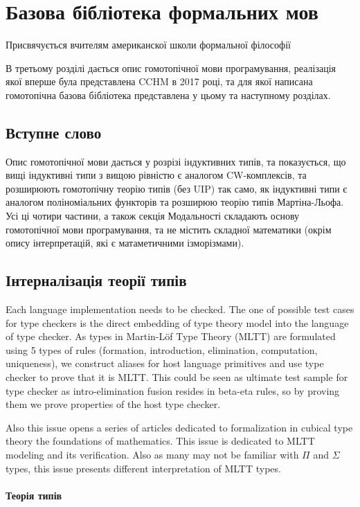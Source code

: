 \chapter{Базова бібліотека формальних мов}
\epigraph{Присвячується вчителям американскої школи формальної філософії}{}

В третьому розділі дається опис гомотопічної мови програмування,
реалізація якої вперше була представлена CCHM в 2017 році, та для якої написана
гомотопічна базова бібліотека представлена у цьому та наступному розділах.

\section*{Вступне слово}

Опис гомотопічної мови дається у розрізі індуктивних типів, та показується,
що вищі індуктивні типи з вищою рівністю є аналогом CW-комплексів, та розширюють
гомотопічну теорію типів (без UIP) так само, як індуктивні типи є аналогом
поліноміальних функторів та розширюю теорію типів Мартіна-Льофа. Усі ці чотири
частини, а також секція Модальності складають основу гомотопічної мови програмування,
та не містить складної математики (окрім опису інтерпретацій,
які є матаметичними ізморізмами).

\section{Інтерналізація теорії типів}

Each language implementation needs to be checked. The one of possible test cases
for type checkers is the direct embedding of type theory model into the language of type checker.
As types in Martin-Löf Type Theory (MLTT) are formulated using 5 types of rules (formation,
introduction, elimination, computation, uniqueness), we construct aliases
for host language primitives and use type checker to prove that it is MLTT.
This could be seen as ultimate test sample for type checker as
intro-elimination fusion resides in beta-eta rules, so by proving them
we prove properties of the host type checker.

Also this issue opens a series of articles dedicated to formalization in
cubical type theory the foundations of mathematics. This issue is dedicated
to MLTT modeling and its verification. Also as many may not be familiar with
$\Pi$ and $\Sigma$ types, this issue presents different interpretation of MLTT types.

\subsubsection{Теорія типів}

